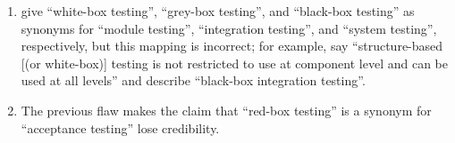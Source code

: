 \begin{enumerate}
    \item %
          \citet[p.~18]{SneedAndGöschl2000} give
          ``white-box testing'', ``grey-box testing'', and ``black-box testing''
          as synonyms for ``module testing'', ``integration testing'', and
          ``system testing'', respectively, but this mapping is incorrect; for
          example, \citet[p.~444]{IEEE2017} say ``structure-based [(or white-box)]
          testing is not restricted to use at component level and can be used
          at all levels'' and \citet[pp.~345\==346]{SakamotoEtAl2013} describe
          ``black-box integration testing''.
    \item %
          The previous flaw makes the claim that
          ``red-box testing'' is a synonym for ``acceptance testing''
          \citep[p.~18]{SneedAndGöschl2000} lose credibility.
\end{enumerate}
